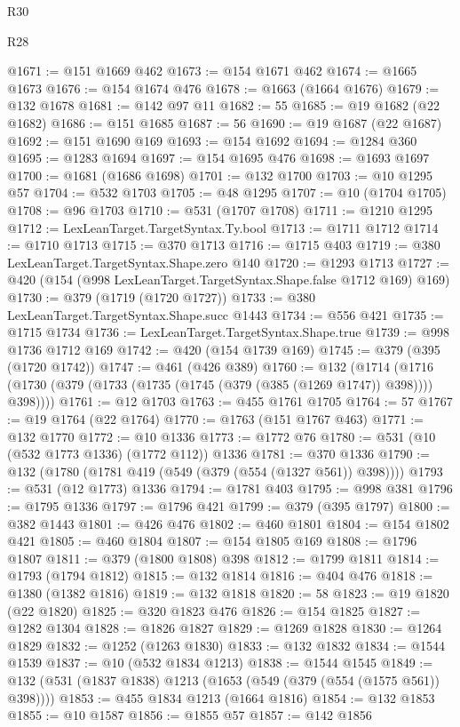 \begin{lexlean}{R30}
\begin{lexlean}{R28}
\begin{coremodule}
{{{{{{{{{{{{{{{{{{{{{{{{{{{{{{{{{{{{{{{{{{{{{{{{{{{{{{{{{{{{{{{{{{{{{{{{{{{{{{{{{{{{{{{{{{{{{{{{{{{{{{{{{{{{{{{{{{{{{{{{{{{{{{{{{{{{{{{{{{{{{{{@1671 := @151 @1669 @462
@1673 := @154 @1671 @462
@1674 := @1665 @1673
@1676 := @154 @1674 @476
@1678 := @1663 (@1664 @1676)
@1679 := @132 @1678
@1681 := @142 @97 @11
@1682 := 55
@1685 := @19 @1682 (@22 @1682)
@1686 := @151 @1685
@1687 := 56
@1690 := @19 @1687 (@22 @1687)
@1692 := @151 @1690 @169
@1693 := @154 @1692
@1694 := @1284 @360
@1695 := @1283 @1694
@1697 := @154 @1695 @476
@1698 := @1693 @1697
@1700 := @1681 (@1686 @1698)
@1701 := @132 @1700
@1703 := @10 @1295 @57
@1704 := @532 @1703
@1705 := @48 @1295
@1707 := @10 (@1704 @1705)
@1708 := @96 @1703
@1710 := @531 (@1707 @1708)
@1711 := @1210 @1295
@1712 := LexLeanTarget.TargetSyntax.Ty.bool
@1713 := @1711 @1712
@1714 := @1710 @1713
@1715 := @370 @1713
@1716 := @1715 @403
@1719 := @380 LexLeanTarget.TargetSyntax.Shape.zero @140
@1720 := @1293 @1713
@1727 := @420 (@154 (@998 LexLeanTarget.TargetSyntax.Shape.false @1712 @169) @169)
@1730 := @379 (@1719 (@1720 @1727))
@1733 := @380 LexLeanTarget.TargetSyntax.Shape.succ @1443
@1734 := @556 @421
@1735 := @1715 @1734
@1736 := LexLeanTarget.TargetSyntax.Shape.true
@1739 := @998 @1736 @1712 @169
@1742 := @420 (@154 @1739 @169)
@1745 := @379 (@395 (@1720 @1742))
@1747 := @461 (@426 @389)
@1760 := @132
    (@1714 (@1716 (@1730 (@379 (@1733 (@1735 (@1745 (@379 (@385 (@1269 @1747)) @398)))) @398))))
@1761 := @12 @1703
@1763 := @455 @1761 @1705
@1764 := 57
@1767 := @19 @1764 (@22 @1764)
@1770 := @1763 (@151 @1767 @463)
@1771 := @132 @1770
@1772 := @10 @1336
@1773 := @1772 @76
@1780 := @531 (@10 (@532 @1773 @1336) (@1772 @112)) @1336
@1781 := @370 @1336
@1790 := @132 (@1780 (@1781 @419 (@549 (@379 (@554 (@1327 @561)) @398))))
@1793 := @531 (@12 @1773) @1336
@1794 := @1781 @403
@1795 := @998 @381
@1796 := @1795 @1336
@1797 := @1796 @421
@1799 := @379 (@395 @1797)
@1800 := @382 @1443
@1801 := @426 @476
@1802 := @460 @1801
@1804 := @154 @1802 @421
@1805 := @460 @1804
@1807 := @154 @1805 @169
@1808 := @1796 @1807
@1811 := @379 (@1800 @1808) @398
@1812 := @1799 @1811
@1814 := @1793 (@1794 @1812)
@1815 := @132 @1814
@1816 := @404 @476
@1818 := @1380 (@1382 @1816)
@1819 := @132 @1818
@1820 := 58
@1823 := @19 @1820 (@22 @1820)
@1825 := @320 @1823 @476
@1826 := @154 @1825
@1827 := @1282 @1304
@1828 := @1826 @1827
@1829 := @1269 @1828
@1830 := @1264 @1829
@1832 := @1252 (@1263 @1830)
@1833 := @132 @1832
@1834 := @1544 @1539
@1837 := @10 (@532 @1834 @1213)
@1838 := @1544 @1545
@1849 := @132 (@531 (@1837 @1838) @1213 (@1653 (@549 (@379 (@554 (@1575 @561)) @398))))
@1853 := @455 @1834 @1213 (@1664 @1816)
@1854 := @132 @1853
@1855 := @10 @1587
@1856 := @1855 @57
@1857 := @142 @1856
}}}}}}}}}}}}}}}}}}}}}}}}}}}}}}}}}}}}}}}}}}}}}}}}}}}}}}}}}}}}}}}}}}}}}}}}}}}}}}}}}}}}}}}}}}}}}}}}}}}}}}}}}}}}}}}}}}}}}}}}}}}}}}}}}}}}}}}}}}}}}}}
\end{coremodule}
\end{lexlean}
\end{lexlean}
